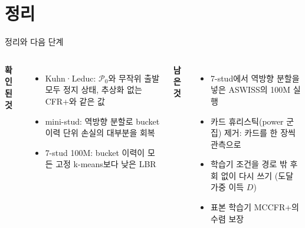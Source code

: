 \documentclass[aspectratio=169,11pt]{beamer}
\newcommand{\Pc}{\mathcal P}
\begin{document}
\section{정리}
\begin{frame}{정리와 다음 단계}
\begin{columns}[T,onlytextwidth]
\textbf{\textcolor{deepblue}{확인된 것}}
\small
\begin{itemize}
\item[\textcolor{deepblue}{\checkmark}] Kuhn·Leduc: $\Pc_0$와 무작위 출발 모두 정지 상태, 추상화 없는 CFR+와 같은 값
\item[\textcolor{deepblue}{\checkmark}] mini-stud: 역방향 분할로 bucket 이력 단위 손실의 대부분을 회복
\item[\textcolor{deepblue}{\checkmark}] 7-stud 100M: bucket 이력이 모든 고정 k-means보다 낮은 LBR
\end{itemize}
\textbf{\textcolor{deeporange}{남은 것}}
\small
\begin{itemize}
\item 7-stud에서 역방향 분할을 넣은 ASWISS의 100M 실행
\item 카드 휴리스틱(power 군집) 제거: 카드를 한 장씩 관측으로
\item 학습기 조건을 경로 밖 후회 없이 다시 쓰기 (도달 가중 이득 $D$)
\item 표본 학습기 MCCFR+의 수렴 보장
\end{itemize}
\end{columns}
\end{frame}
\end{document}
